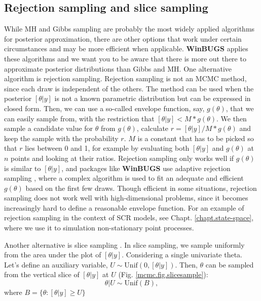 \subsection{Rejection sampling and slice sampling }

While MH and Gibbs sampling are probably the most widely applied
algorithms for posterior approximation, there are other options that
work under certain circumstances and may be more efficient when
applicable. {\bf WinBUGS} applies these algorithms and we want you to be
aware that there is more out there to approximate posterior
distributions than Gibbs and MH.  One alternative algorithm is
rejection sampling. Rejection sampling is not an MCMC method, since
each draw is independent of the others. The method can be used when
the posterior $[\theta|y]$ is not a known parametric distribution but
can be expressed in closed form. Then, we can use a so-called envelope
function, say, $g(\theta)$, that we can easily sample from, with the
restriction that $[\theta|y] < M * g(\theta)$. We then sample a
candidate value for $\theta$ from $g(\theta)$, calculate $r =
[\theta|y]/M*g(\theta)$ and keep the sample with the probability
$r$. $M$ is a constant that has to be picked so that $r$ lies between
0 and 1, for example by evaluating both $[\theta|y]$ and $g(\theta)$
at $n$ points and looking at their ratios. Rejection sampling only
works well if $g(\theta)$ is similar to $[\theta|y]$, and packages
like {\bf WinBUGS} use adaptive rejection sampling \citep{gilks_wild:1992},
where a complex algorithm is used to fit an adequate and efficient
$g(\theta)$ based on the first few draws. 
Though efficient in some
situations, rejection sampling does not work well with
high-dimensional problems, since it becomes increasingly hard to
define a reasonable envelope function. For an example of rejection
sampling in the context of SCR models, see
Chapt. \ref{chapt.state-space}, where we use it to simulation
non-stationary point processes.  

Another alternative is slice sampling
\citep{neal:2003}. In slice sampling, we sample uniformly from the
area under the plot of $[\theta|y]$. Considering a single univariate
theta. Let's define an auxiliary variable, $U \sim \mbox{Unif}(0,
[\theta|y])$. Then, $\theta$ can be sampled from the vertical slice
of $[\theta|y]$ at $U$ (Fig. \ref{mcmc.fig.slicesample}):
\[
\theta|U \sim \mbox{Unif}(B),
\]
where $B = \{\theta: [\theta|y] \geq U\}$

